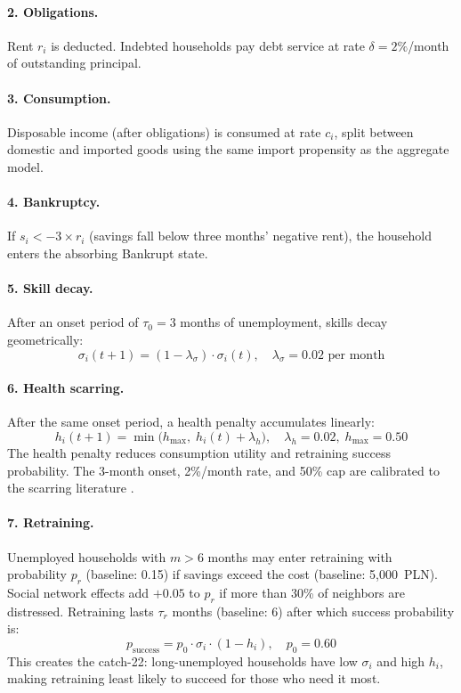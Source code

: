 \documentclass[12pt,a4paper]{article}
\begin{document}
\paragraph{2. Obligations.} Rent $r_i$ is deducted. Indebted households
pay debt service at rate $\delta = 2\%$/month of outstanding principal.

\paragraph{3. Consumption.} Disposable income (after obligations) is
consumed at rate $c_i$, split between domestic and imported goods using
the same import propensity as the aggregate model.

\paragraph{4. Bankruptcy.} If $s_i < -3 \times r_i$ (savings fall below
three months' negative rent), the household enters the absorbing
Bankrupt state.

\paragraph{5. Skill decay.} After an onset period of $\tau_0 = 3$ months
of unemployment, skills decay geometrically:
\begin{equation}
  \sigma_i(t+1) = (1 - \lambda_\sigma) \cdot \sigma_i(t),
  \quad \lambda_\sigma = 0.02 \text{ per month}
  \label{eq:skill-decay}
\end{equation}

\paragraph{6. Health scarring.} After the same onset period, a health
penalty accumulates linearly:
\begin{equation}
  h_i(t+1) = \min\bigl(h_{\max},\; h_i(t) + \lambda_h\bigr),
  \quad \lambda_h = 0.02, \; h_{\max} = 0.50
  \label{eq:health-scarring}
\end{equation}
The health penalty reduces consumption utility and retraining success
probability. The 3-month onset, 2\%/month rate, and 50\% cap are
calibrated to the scarring literature \parencite{arulampalam2001,
jacobson1993}.

\paragraph{7. Retraining.} Unemployed households with $m > 6$ months may
enter retraining with probability $p_r$ (baseline: 0.15) if savings
exceed the cost (baseline: 5,000~PLN). Social network effects add
$+0.05$ to $p_r$ if more than 30\% of neighbors are distressed.
Retraining lasts $\tau_r$ months (baseline: 6) after which success
probability is:
\begin{equation}
  p_{\text{success}} = p_0 \cdot \sigma_i \cdot (1 - h_i),
  \quad p_0 = 0.60
  \label{eq:retrain-success}
\end{equation}
This creates the catch-22: long-unemployed households have low $\sigma_i$
and high $h_i$, making retraining least likely to succeed for those who
need it most.
\end{document}
